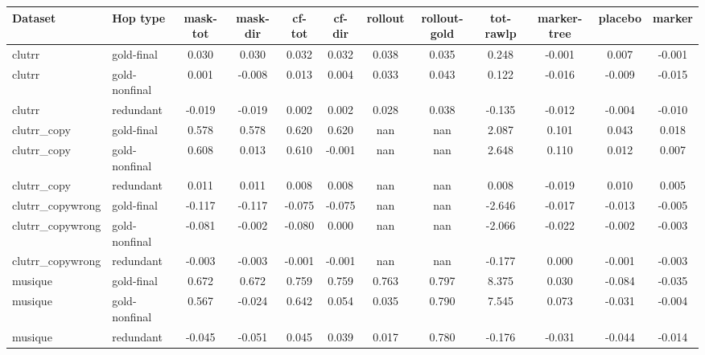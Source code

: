 \begin{tabular}{llcccccccccc}
\toprule
Dataset & Hop type & mask-tot & mask-dir & cf-tot & cf-dir & rollout & rollout-gold & tot-rawlp & marker-tree & placebo & marker \\
\midrule
clutrr & gold-final & 0.030 & 0.030 & 0.032 & 0.032 & 0.038 & 0.035 & 0.248 & -0.001 & 0.007 & -0.001 \\
clutrr & gold-nonfinal & 0.001 & -0.008 & 0.013 & 0.004 & 0.033 & 0.043 & 0.122 & -0.016 & -0.009 & -0.015 \\
clutrr & redundant & -0.019 & -0.019 & 0.002 & 0.002 & 0.028 & 0.038 & -0.135 & -0.012 & -0.004 & -0.010 \\
clutrr\_copy & gold-final & 0.578 & 0.578 & 0.620 & 0.620 & nan & nan & 2.087 & 0.101 & 0.043 & 0.018 \\
clutrr\_copy & gold-nonfinal & 0.608 & 0.013 & 0.610 & -0.001 & nan & nan & 2.648 & 0.110 & 0.012 & 0.007 \\
clutrr\_copy & redundant & 0.011 & 0.011 & 0.008 & 0.008 & nan & nan & 0.008 & -0.019 & 0.010 & 0.005 \\
clutrr\_copywrong & gold-final & -0.117 & -0.117 & -0.075 & -0.075 & nan & nan & -2.646 & -0.017 & -0.013 & -0.005 \\
clutrr\_copywrong & gold-nonfinal & -0.081 & -0.002 & -0.080 & 0.000 & nan & nan & -2.066 & -0.022 & -0.002 & -0.003 \\
clutrr\_copywrong & redundant & -0.003 & -0.003 & -0.001 & -0.001 & nan & nan & -0.177 & 0.000 & -0.001 & -0.003 \\
musique & gold-final & 0.672 & 0.672 & 0.759 & 0.759 & 0.763 & 0.797 & 8.375 & 0.030 & -0.084 & -0.035 \\
musique & gold-nonfinal & 0.567 & -0.024 & 0.642 & 0.054 & 0.035 & 0.790 & 7.545 & 0.073 & -0.031 & -0.004 \\
musique & redundant & -0.045 & -0.051 & 0.045 & 0.039 & 0.017 & 0.780 & -0.176 & -0.031 & -0.044 & -0.014 \\
\bottomrule
\end{tabular}
